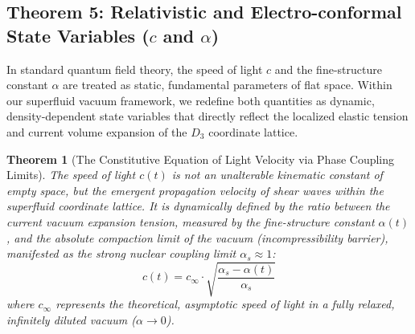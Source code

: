 \documentclass[11pt,a4paper]{article}
\theoremstyle{plain}
\newtheorem{theorem}{Theorem}[section] %
\theoremstyle{definition}
\theoremstyle{remark}
\begin{document}
\subsection{Theorem 5: Relativistic and Electro-conformal State Variables ($c$ and $\alpha$)}
In standard quantum field theory, the speed of light $c$ and the fine-structure constant $\alpha$ are treated as static, fundamental parameters of flat space. Within our superfluid vacuum framework, we redefine both quantities as dynamic, density-dependent state variables that directly reflect the localized elastic tension and current volume expansion of the $D_3$ coordinate lattice.

\begin{theorem}[The Constitutive Equation of Light Velocity via Phase Coupling Limits]
The speed of light $c(t)$ is not an unalterable kinematic constant of empty space, but the emergent propagation velocity of shear waves within the superfluid coordinate lattice. It is dynamically defined by the ratio between the current vacuum expansion tension, measured by the fine-structure constant $\alpha(t)$, and the absolute compaction limit of the vacuum (incompressibility barrier), manifested as the strong nuclear coupling limit $\alpha_s \approx 1$:
\begin{equation}
c(t) = c_{\infty} \cdot \sqrt{\frac{\alpha_s - \alpha(t)}{\alpha_s}}
\end{equation}
where $c_{\infty}$ represents the theoretical, asymptotic speed of light in a fully relaxed, infinitely diluted vacuum ($\alpha \to 0$).
\end{theorem}
\end{document}
